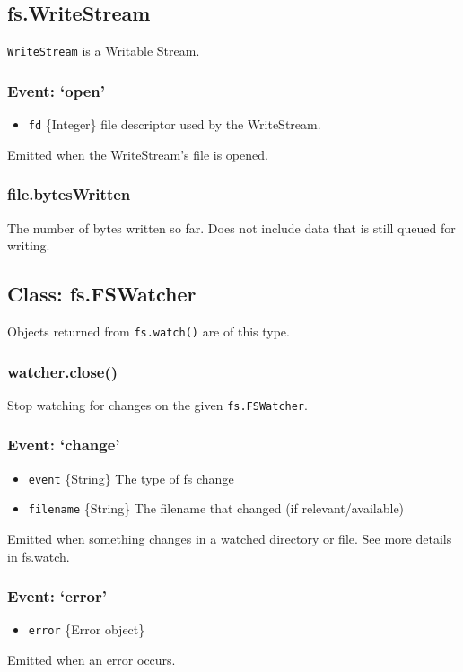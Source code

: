 \subsection{fs.WriteStream}

\texttt{WriteStream} is a
\href{stream.html\#stream\_writable\_stream}{Writable Stream}.

\subsubsection{Event: `open'}

\begin{itemize}
\item
  \texttt{fd} \{Integer\} file descriptor used by the WriteStream.
\end{itemize}

Emitted when the WriteStream's file is opened.

\subsubsection{file.bytesWritten}

The number of bytes written so far. Does not include data that is still
queued for writing.

\subsection{Class: fs.FSWatcher}

Objects returned from \texttt{fs.watch()} are of this type.

\subsubsection{watcher.close()}

Stop watching for changes on the given \texttt{fs.FSWatcher}.

\subsubsection{Event: `change'}

\begin{itemize}
\item
  \texttt{event} \{String\} The type of fs change
\item
  \texttt{filename} \{String\} The filename that changed (if
  relevant/available)
\end{itemize}

Emitted when something changes in a watched directory or file. See more
details in
\hyperref[fs\_fs\_watch\_filename\_options\_listener]{fs.watch}.

\subsubsection{Event: `error'}

\begin{itemize}
\item
  \texttt{error} \{Error object\}
\end{itemize}

Emitted when an error occurs.
